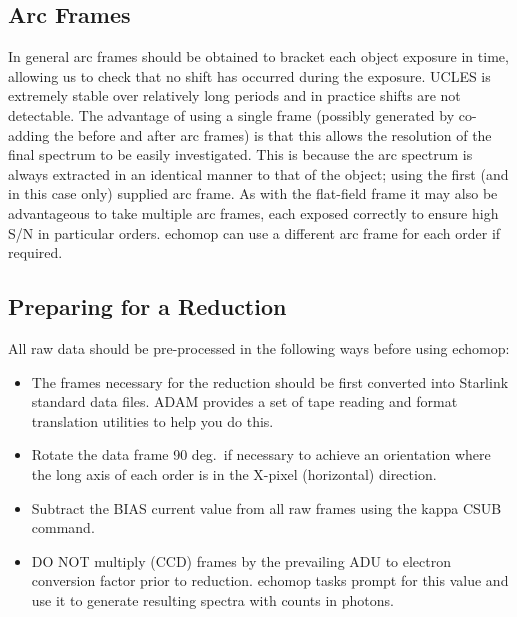 \documentclass[11pt,twoside]{article}
\newcommand{\xref}[3]{#1}
\newcommand{\xlabel}[1]{}
\newcommand{\mlabel}[1]{\xlabel{#1}\label{#1}}
\newcommand{\myindex}[1]{\index{#1}}
\renewcommand{\myindex}[1]{}
\begin{document}
\subsection{\mlabel{observer_arc_frames}Arc Frames}
\myindex{Arc lamp frames}
\myindex{UCLES}

In general arc frames should be obtained to bracket each object exposure
in time, allowing us to check that no shift has occurred during the
exposure. UCLES is extremely stable over relatively long periods and in
practice shifts are not detectable. The advantage of using a
single frame (possibly generated by co-adding the before and after arc
frames) is that this allows the resolution of the final spectrum to be
easily investigated. This is because the arc spectrum is always
extracted in an identical manner to that of the object; using the first
(and in this case only) supplied arc frame. As with the flat-field frame
it may also be advantageous to take multiple arc frames, each exposed
correctly to ensure high S/N in particular orders.  {\sc echomop} can
use a different arc frame for each order if required.

\subsection{\mlabel{frame_preparation}Preparing for a Reduction}
\myindex{Frame!preparation}

All raw data should be pre-processed in the following ways before
using {\sc echomop}:

\begin{itemize}

\item \myindex{ADAM!data files}
      The frames necessary for the reduction should be first converted into
      Starlink standard data files.  \xref{ADAM}{sg4}{} provides a set of
      tape reading and format translation utilities to help you do this.

\item \myindex{Frame!rotation}
      Rotate the data frame 90 deg.\ if necessary to achieve an orientation
      where the long axis of each order is in the X-pixel (horizontal)
      direction.

\item \myindex{CCD!bias}
      Subtract the BIAS current value from all raw frames using the
      \xref{{\sc kappa}}{sun95}{} \xref{CSUB}{sun95}{CSUB} command.

\item \myindex{ADUs}
      DO NOT multiply (CCD) frames by the prevailing ADU to electron
      conversion factor prior to reduction.  {\sc echomop} tasks prompt for
      this value and use it to generate resulting spectra with counts in
      photons.

\end{itemize}
\end{document}
